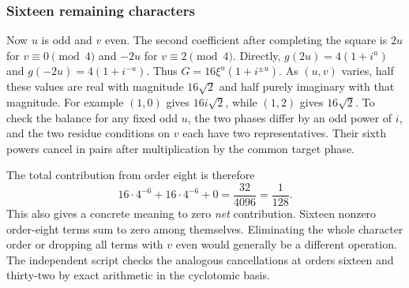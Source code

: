 \documentclass[12pt,letterpaper]{article}
\begin{document}
\subsubsection{Sixteen remaining characters}
Now $u$ is odd and $v$ even. The second coefficient after completing the square is $2u$ for $v\equiv0\pmod4$ and $-2u$ for $v\equiv2\pmod4$. Directly, $g(2u)=4(1+i^u)$ and $g(-2u)=4(1+i^{-u})$. Thus $G=16\xi^u(1+i^{\pm u})$. As $(u,v)$ varies, half these values are real with magnitude $16\sqrt2$ and half purely imaginary with that magnitude. For example $(1,0)$ gives $16i\sqrt2$, while $(1,2)$ gives $16\sqrt2$. To check the balance for any fixed odd $u$, the two phases differ by an odd power of $i$, and the two residue conditions on $v$ each have two representatives. Their sixth powers cancel in pairs after multiplication by the common target phase.
\par
The total contribution from order eight is therefore
\[
        16\cdot4^{-6}+16\cdot4^{-6}+0=\frac{32}{4096}=\frac1{128}.
\]
This also gives a concrete meaning to zero \emph{net} contribution. Sixteen nonzero order-eight terms sum to zero among themselves. Eliminating the whole character order or dropping all terms with $v$ even would generally be a different operation. The independent script checks the analogous cancellations at orders sixteen and thirty-two by exact arithmetic in the cyclotomic basis.
\end{document}
